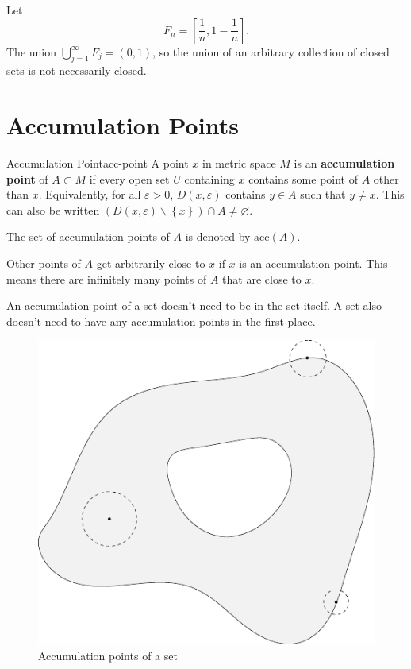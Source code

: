 \documentclass[10pt]{report}
\begin{document}
\begin{ex}{}{}
	Let \[F_n = \left[\frac{1}{n}, 1-\frac{1}{n}\right] .\] The union $\bigcup_{j=1}^\infty F_j = (0,1)$, so the union of an arbitrary collection of closed sets is not necessarily closed.
\end{ex}


\section{Accumulation Points}
\begin{defn}{Accumulation Point}{acc-point}
	A point $x$ in metric space $M$ is an \textbf{accumulation point} of $A \subset M$ if every open set $U$ containing $x$ contains some point of $A$ other than $x$. Equivalently, for all $\varepsilon>0$, $D(x,\varepsilon)$ contains $y\in A$ such that $y\neq x$. This can also be written $\left(D(x,\varepsilon) \backslash \left\{ x \right\}\right) \cap A \neq \varnothing$.

	The set of accumulation points of $A$ is denoted by $\text{acc}(A)$.
\end{defn}

Other points of $A$ get arbitrarily close to $x$ if $x$ is an accumulation point. This means there are infinitely many points of $A$ that are close to $x$.

An accumulation point of a set doesn't need to be in the set itself. A set also doesn't need to have any accumulation points in the first place.

\begin{figure}[H]
	\centering
	\includegraphics[scale=1]{fig/accumulation-pt.pdf}
	\caption{Accumulation points of a set}
\end{figure}
\end{document}
